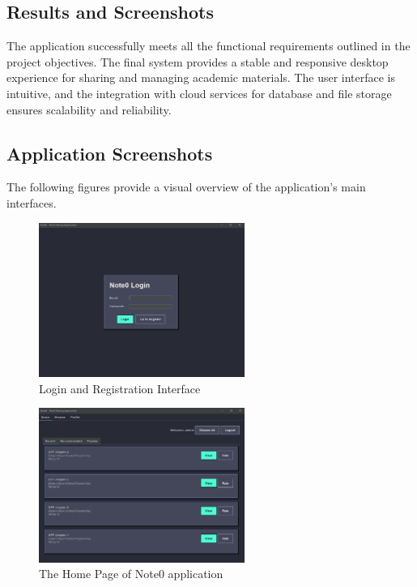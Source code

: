 \documentclass[12pt, a4paper]{report}
\begin{document}
\begin{itemize}
\section{Results and Screenshots}
The application successfully meets all the functional requirements outlined in the project objectives. The final system provides a stable and responsive desktop experience for sharing and managing academic materials. The user interface is intuitive, and the integration with cloud services for database and file storage ensures scalability and reliability.

\subsection{Application Screenshots}
The following figures provide a visual overview of the application's main interfaces.
\begin{figure}[h!]
    \centering
    \includegraphics[width=0.6\textwidth]{new_images_note/login_page.png} %
    \caption{Login and Registration Interface}
    \label{fig:home_page}
\end{figure}
\begin{figure}[h!]
    \centering
    \includegraphics[width=0.6\textwidth]{new_images_note/home_page.png} %
    \caption{The Home Page of Note0 application}
    \label{fig:home_page}
\end{figure}


\end{itemize}
\end{document}
